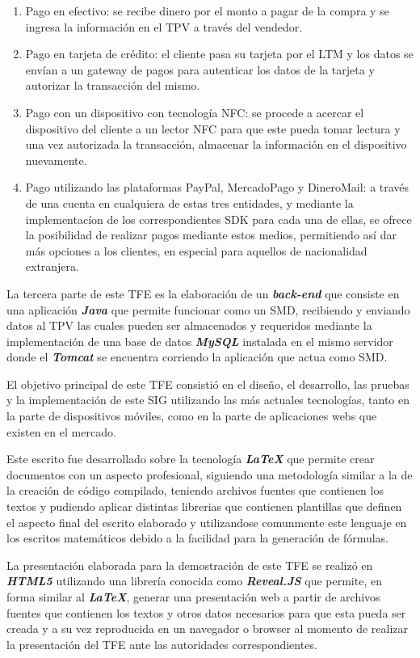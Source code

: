 \begin{enumerate}
\item Pago en efectivo: se recibe dinero por el monto a pagar de la compra y se ingresa la informaci\'on en el \ac{TPV} a trav\'es del vendedor.
\item Pago en tarjeta de cr\'edito: el cliente pasa su tarjeta por el \ac{LTM} y los datos se env\'ian a un gateway de pagos para autenticar los datos de la tarjeta y autorizar la transacci\'on del mismo.
\item Pago con un dispositivo con tecnolog\'ia \ac{NFC}: se procede a acercar el dispositivo del cliente a un lector \ac{NFC} para que este pueda tomar lectura y una vez autorizada la transacci\'on, almacenar la informaci\'on en el dispositivo nuevamente.
\item Pago utilizando las plataformas PayPal\Si{\texttrademark}, MercadoPago\Si{\texttrademark} y DineroMail\Si{\texttrademark}: a trav\'es de una cuenta en cualquiera de estas tres entidades, y mediante la implementac\'ion de los correspondientes \ac{SDK} para cada una de ellas, se ofrece la posibilidad de realizar pagos mediante estos medios, permitiendo as\'i dar m\'as opciones a los clientes, en especial para aquellos de nacionalidad extranjera.
\end{enumerate}

La tercera parte de este \ac{TFE} es la elaboraci\'on de un \textbf{\textit{back-end}} que consiste en una aplicaci\'on \textbf{\textit{Java}} que permite funcionar como un \ac{SMD}, recibiendo y enviando datos al \ac{TPV} las cuales pueden ser almacenados y requeridos mediante la implementaci\'on de una base de datos \textbf{\textit{MySQL}} instalada en el mismo servidor donde el \textbf{\textit{Tomcat}} se encuentra corriendo la aplicaci\'on que actua como \ac{SMD}.

El objetivo principal de este \ac{TFE} consisti\'o en el dise\~no, el desarrollo, las pruebas y la implementaci\'on de este \ac{SIG} utilizando las m\'as actuales tecnolog\'ias, tanto en la parte de dispositivos m\'oviles, como en la parte de aplicaciones webs que existen en el mercado.

Este escrito fue desarrollado sobre la tecnolog\'ia \textbf{\textit{LaTeX}} que permite crear documentos con un aspecto profesional, siguiendo una metodolog\'ia similar a la de la creaci\'on de c\'odigo compilado, teniendo archivos fuentes que contienen los textos y pudiendo aplicar distintas librerias que contienen plantillas que definen el aspecto final del escrito elaborado y utilizandose comunmente este lenguaje en los escritos matem\'aticos debido a la facilidad para la generaci\'on de f\'ormulas.

La presentaci\'on elaborada para la demostraci\'on de este \ac{TFE} se realiz\'o en \textbf{\textit{HTML5}} utilizando una librer\'ia conocida como \textbf{\textit{Reveal.JS}} que permite, en forma similar al \textbf{\textit{LaTeX}}, generar una presentaci\'on web a partir de archivos fuentes que contienen los textos y otros datos necesarios para que esta pueda ser creada y a su vez reproducida en un navegador o browser al momento de realizar la presentaci\'on del \ac{TFE} ante las autoridades correspondientes.

